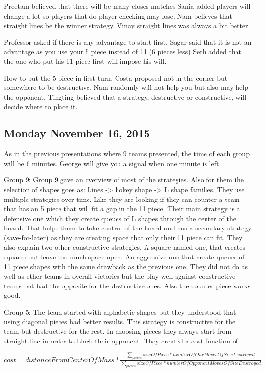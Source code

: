 Preetam believed that there will be many closes matches
Sania added players will change a lot so players that do player checking may lose.
Nam believes that straight lines be the winner strategy.
Vinay straight lines was always a bit better.

Professor asked if there is any advantage to start first.
Sagar said  that it is not an advantage as you use your 5 piece instead of 11 (6 pieces less)
Seth added  that the one who put his 11 piece first will impose his will.

How to put the 5 piece in first turn.
Costa proposed not in the corner but somewhere to be destructive.
Nam randomly will not help you but also may help the opponent.
Tingting believed that a strategy, destructive or constructive, will decide where to place it.
\subsection{Monday November 16, 2015}
As in the previous presentations where 9 teams presented, the time of each group
will be 6 minutes. George will give you a signal when one minute is left.

Group 9:
Group 9 gave an overview of most of the strategies. Also for them the selection
of shapes goes as: Lines -> hokey shape -> L shape families. They use multiple 
strategies over time. Like they are looking if they can counter a team that has
an 5 piece that will fit a gap in the 11 piece. Their main strategy is a defensive
one which they create queues of L shapes through the center of the board. That
helps them to take control of the board and has a secondary strategy (save-for-later)
as they are creating space that only their 11 piece can fit. They also explain
two other constructive strategies. A square named one, that creates squares but
leave too much space open. An aggressive one that create queues of 11 piece shapes
with the same drawback as the previous one. They did not do as well as other teams
in overall victories but the play well against constructive teams but had the 
opposite for the destructive ones. Also the counter piece works good.

Group 5:
The team started with alphabetic shapes but they understood that using diagonal
pieces had better results. This strategy is constructive for the team but destructive
for the rest. In choosing pieces they always start from straight line in order to
block their opponent. They created a cost function of 

$cost = distanceFromCenterOfMass * 
\frac{\sum_{pieces}{sizeOfPiece*numberOfOurMovesOfSizeDestroyed}}{\sum_{pieces}{sizeOfPiece*numberOfOpponentMovesOfSizeDestroyed}}$

